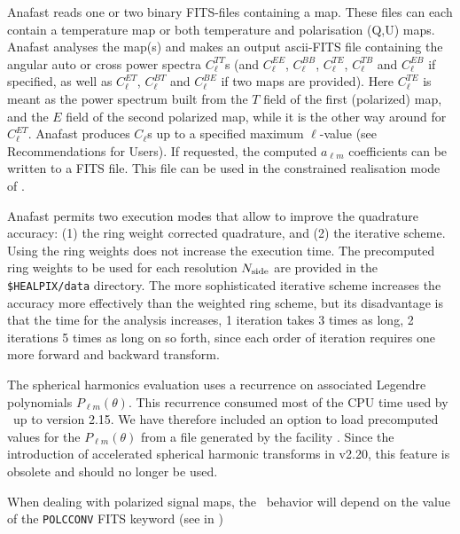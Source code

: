 \begin{codedescription}
{Anafast reads one or two binary FITS-files containing a \healpix map. These
files can each contain
a temperature map or both temperature and polarisation (Q,U) maps. Anafast analyses
the map(s) and makes an output ascii-FITS file containing the angular auto or cross
power spectra $C^{TT}_\ell$s
(and $C^{EE}_\ell$, $C^{BB}_\ell$, $C^{TE}_\ell$, $C^{TB}_\ell$ and $C^{EB}_\ell$ if specified, as well
as $C^{ET}_\ell$, $C^{BT}_\ell$ and $C^{BE}_\ell$ if two maps are provided). 
Here $C^{TE}_\ell$ is meant as the power
spectrum built from the $T$ field of the first (polarized) map, and the $E$
field of the second polarized map, while it is the other way around for $C^{ET}_\ell$.
Anafast produces $C_\ell$s up to a specified maximum $\ell$-value
(see Recommendations for Users). 
If requested, the computed $a_{\ell m}$ coefficients 
can  be written to a FITS file. This file can be used in the 
constrained realisation mode  of  . 

Anafast permits two execution modes that allow to improve 
the quadrature accuracy: 
(1) the  ring weight corrected quadrature, and
(2)  the  iterative scheme. 
Using the ring weights does not increase the execution time.  
The precomputed ring weights to be used for each 
\healpix resolution $N_{\mathrm{side}}$ are provided in
the {\tt \$HEALPIX/data} directory. 
The more sophisticated iterative scheme increases the
accuracy more effectively than the weighted ring scheme,
but its disadvantage is that the time for the analysis
increases, 1 iteration takes 3 times as long, 2 iterations 5 times as
long on so forth, since each order of iteration requires one more forward
and backward transform. 

The spherical harmonics evaluation uses  a
recurrence on associated Legendre polynomials $P_{\ell m}(\theta)$. 
This recurrence consumed most of the CPU time used by \thedocid\ up to version
2.15. We have therefore included an option to load precomputed values for the
$P_{\ell m}(\theta)$ from a file generated by the \healpix facility
. Since the introduction of accelerated spherical
harmonic transforms in \healpix v2.20, this feature is obsolete and should no
longer be used. 

When dealing with polarized signal maps, the \thedocid\ behavior will depend on the value of the \texttt{POLCCONV} FITS keyword
(see  in )
}
\end{codedescription}

